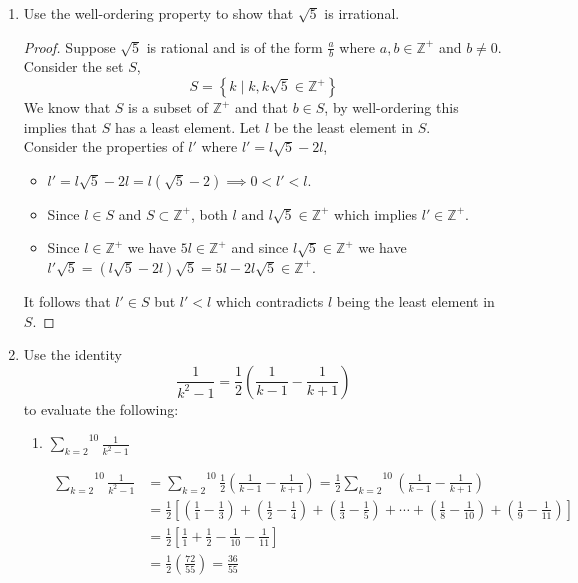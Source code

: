 \documentclass{article}
\def\inlinesum#1#2{\overset{#2}{\underset{#1}{\sum}}}
\begin{document}
\begin{enumerate}
\item
  Use the well-ordering property to show that
  $\sqrt 5$ is irrational.
  \begin{proof}
    Suppose $\sqrt{5}$ is rational and is of the form $\frac{a}{b}$ where $a,b\in\mathbb{Z}^+$ and $b\neq 0$.
    Consider the set $S$,
    $$S = \left\{ k \mid k, k\sqrt{5}\in\mathbb{Z}^+ \right\}$$
    We know that $S$ is a subset of $\mathbb{Z}^+$ and that $b\in S$, by well-ordering this implies that $S$ has a least element.
    Let $l$ be the least element in $S$.\\
    Consider the properties of $l'$ where $l' = l\sqrt{5}-2l$,
    \begin{itemize}
      \item $l'=l\sqrt{5}-2l= l(\sqrt{5}-2) \implies 0 < l' < l$.
      \item Since $l\in S$ and $S\subset \mathbb{Z}^+$, both $l \text{ and }l\sqrt{5}\in\mathbb{Z}^+$ which implies $l'\in\mathbb{Z}^+$.
      \item Since $l\in\mathbb{Z}^+$ we have $5l\in\mathbb{Z}^+$ and since $l\sqrt{5}\in\mathbb{Z}^+$ we have $l'\sqrt{5}= (l\sqrt{5}-2l)\sqrt{5}= 5l-2l\sqrt{5}\in\mathbb{Z}^+$.
    \end{itemize}
    It follows that $l'\in S$ but $l' < l$ which contradicts $l$ being the least element in $S$.
  \end{proof}
  \pagebreak

\item
  Use the identity
  $$\frac1{k^2-1}=\frac12\left(\frac1{k-1}-\frac1{k+1}\right)$$
  to evaluate the following:
  \begin{enumerate}

  \item
    $\inlinesum{k=2}{10}\frac1{k^2-1}$

    \begin{align*}
      \inlinesum{k=2}{10}\frac{1}{k^2-1} &=\inlinesum{k=2}{10}\frac{1}{2}\left(\frac{1}{k-1}-\frac{1}{k+1}\right)= \frac{1}{2}\inlinesum{k=2}{10}\left(\frac{1}{k-1}-\frac{1}{k+1}\right) \\
      &= \frac{1}{2}\left[\left(\frac{1}{1}-\frac{1}{3}\right) + \left(\frac{1}{2}-\frac{1}{4}\right) + \left(\frac{1}{3}-\frac{1}{5}\right) + \cdots + \left(\frac{1}{8}-\frac{1}{10}\right) + \left(\frac{1}{9}-\frac{1}{11}\right)\right] \\
      &= \frac{1}{2}\left[\frac{1}{1} + \frac{1}{2} - \frac{1}{10} - \frac{1}{11}\right] \\
      &= \frac{1}{2}\left(\frac{72}{55}\right) = \frac{36}{55}
    \end{align*}


\end{enumerate}
\end{enumerate}
\end{document}
